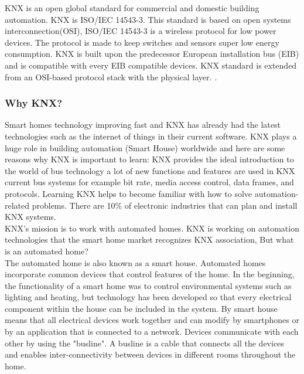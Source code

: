 \documentclass{article}
\begin{document}
KNX is an open global standard for commercial and domestic building automation. KNX is ISO/IEC
14543-3. This standard is based on open systems interconnection(OSI)\cite{alma991000857549505936}, ISO/IEC 14543-3 is a
wireless protocol for low power devices. The protocol is made to keep switches and sensors super
low energy consumption. KNX is built upon the predecessor European installation bus
(EIB) and is compatible with every EIB compatible devices.   
KNX standard is extended from an OSI-based protocol stack with the physical layer. \cite{iso}\cite{Automation}.
 \subsubsection{Why KNX?}
 Smart homes technology improving fast and KNX has already had the latest technologies such as the internet of things in their current software. KNX plays a huge role in building automation (Smart House) worldwide and here are some reasons why KNX is important to learn: 
KNX provides the ideal introduction to the world of bus technology a lot of new functions and features are used in KNX current bus systems for example bit rate, media access control, data frames, and protocols. Learning KNX helps to become familiar with how to solve automation-related problems. There are 10\% of electronic industries that can plan and install KNX systems.\cite{KNXBenefits}\cite{Automation} \\

KNX's mission is to work with automated homes. KNX is working on automation technologies that the smart home market recognizes KNX association, But what is an automated home?\\
The automated home is also known as a smart house. Automated homes incorporate common devices that control features of the home. In the beginning, the functionality of a smart home was to control environmental systems such as lighting and heating, but technology has been developed so that every electrical component within the house can be included in the system. By smart house means that all electrical devices work together and can modify by smartphones or by an application that is connected to a network. Devices communicate with each other by using the "busline". A busline is a cable that connects all the devices and enables inter-connectivity between devices in different rooms throughout the home. \cite{SETAG}\cite{Automation} \cite{TheAdaptiveHouse}
\end{document}
